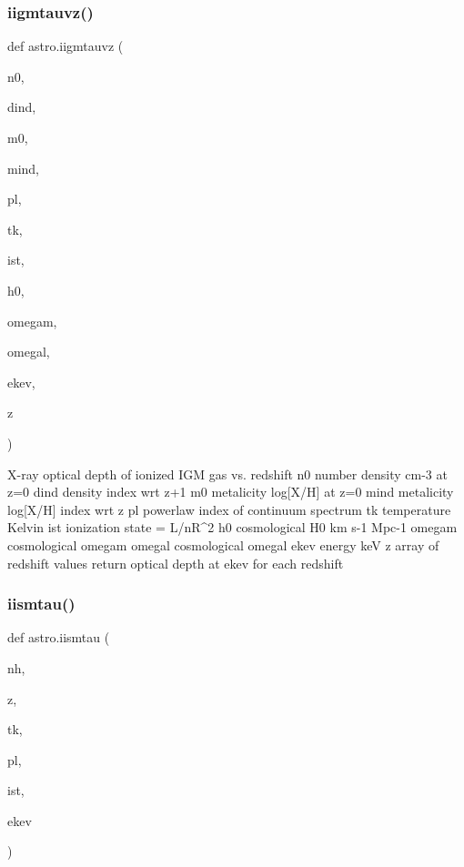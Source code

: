 \subsubsection{\texorpdfstring{iigmtauvz()}{iigmtauvz()}}
{\footnotesize\ttfamily def astro.\+iigmtauvz (\begin{DoxyParamCaption}\item[{}]{n0,  }\item[{}]{dind,  }\item[{}]{m0,  }\item[{}]{mind,  }\item[{}]{pl,  }\item[{}]{tk,  }\item[{}]{ist,  }\item[{}]{h0,  }\item[{}]{omegam,  }\item[{}]{omegal,  }\item[{}]{ekev,  }\item[{}]{z }\end{DoxyParamCaption})}

\begin{DoxyVerb}X-ray optical depth of ionized IGM gas vs. redshift
    n0     number density cm-3 at z=0
    dind   density index wrt z+1
    m0     metalicity log[X/H] at z=0
    mind   metalicity log[X/H] index wrt z
    pl     powerlaw index of continuum spectrum
    tk     temperature Kelvin
    ist    ionization state = L/nR^2
    h0     cosmological H0 km s-1 Mpc-1
    omegam cosmological omegam
    omegal cosmological omegal
    ekev   energy keV
    z      array of redshift values
return optical depth at ekev for each redshift
\end{DoxyVerb}
 \mbox{\label{namespaceastro_afd6fe35b31d85f090f917bfaf3551b99}} 
\subsubsection{\texorpdfstring{iismtau()}{iismtau()}}
{\footnotesize\ttfamily def astro.\+iismtau (\begin{DoxyParamCaption}\item[{}]{nh,  }\item[{}]{z,  }\item[{}]{tk,  }\item[{}]{pl,  }\item[{}]{ist,  }\item[{}]{ekev }\end{DoxyParamCaption})}

